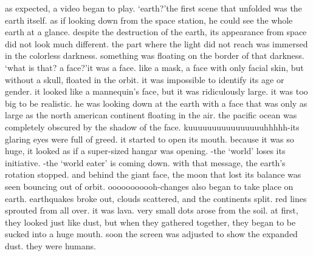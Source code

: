 as expected, a video began to play.
‘earth?’the first scene that unfolded was the earth itself.
 as if looking down from the space station, he could see the whole earth at a glance.
despite the destruction of the earth, its appearance from space did not look much different.
 the part where the light did not reach was immersed in the colorless darkness.
something was floating on the border of that darkness.
‘what is that? a face?’it was a face.
 like a mask, a face with only facial skin, but without a skull, floated in the orbit.
 it was impossible to identify its age or gender.
 it looked like a mannequin’s face, but it was ridiculously large.
 it was too big to be realistic.
 he was looking down at the earth with a face that was only as large as the north american continent floating in the air.
 the pacific ocean was completely obscured by the shadow of the face.
kuuuuuuuuuuuuuuuuhhhhh-its glaring eyes were full of greed.
 it started to open its mouth.
 because it was so huge, it looked as if a super-sized hangar was opening.
-the ‘world’ loses its initiative.
-the ‘world eater’ is coming down.
with that message, the earth’s rotation stopped.
 and behind the giant face, the moon that lost its balance was seen bouncing out of orbit.
ooooooooooh-changes also began to take place on earth.
earthquakes broke out, clouds scattered, and the continents split.
 red lines sprouted from all over.
 it was lava.
 very small dots arose from the soil.
 at first, they looked just like dust, but when they gathered together, they began to be sucked into a huge mouth.
 soon the screen was adjusted to show the expanded dust.
they were humans.

